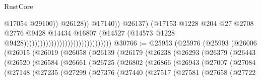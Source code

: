 \begin{lexlean}{RustCore}
\begin{coremodule}
                                                                            @17054
                                                                            @29100))
                                                                        @26128))
                                                                    @17140))
                                                                @26137)
                                                              (@17153
                                                                @1228
                                                                @204
                                                                @27
                                                                @2708
                                                                @2776
                                                                @9428
                                                                @14434
                                                                @16807
                                                                (@14527
                                                                  (@14573
                                                                    @1228
                                                                    @9428))))))))))))))))))))))))))))))))
@30766 := @25953
    (@25976
      (@25993
        (@26006
          (@26015
            (@26019
              (@26058
                (@26139
                  (@26179
                    (@26238
                      (@26293
                        (@26379
                          (@26443
                            (@26520
                              (@26584
                                (@26661
                                  (@26725
                                    (@26802
                                      (@26866
                                        (@26943
                                          (@27007
                                            (@27084
                                              (@27148
                                                (@27235
                                                  (@27299
                                                    (@27376
                                                      (@27440
                                                        (@27517
                                                          (@27581
                                                            (@27658
                                                              (@27722

\end{coremodule}
\end{lexlean}
